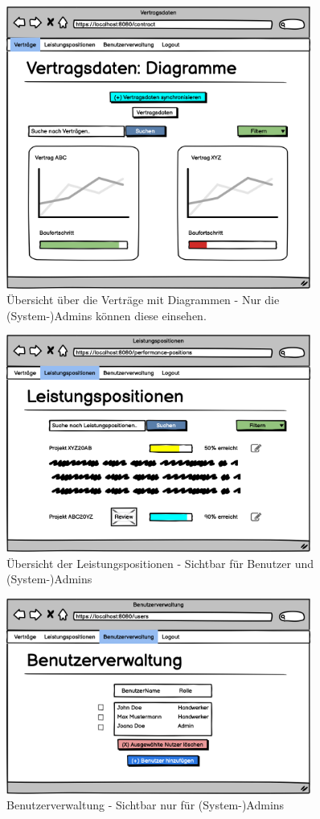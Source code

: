 \begin{figure}[h]
\centering
\includegraphics[width=10cm]{img/mockup_web/admin-vertraege-diagramme.png}
\caption{Übersicht über die Verträge mit Diagrammen - Nur die (System-)Admins können diese einsehen.}
\end{figure}

\begin{figure}[h]
\centering
\includegraphics[width=10cm]{img/mockup_web/admin-und-benutzer-leistungspositionen.png}
\caption{Übersicht der Leistungspositionen - Sichtbar für Benutzer und (System-)Admins}
\end{figure}

\begin{figure}[h]
\centering
\includegraphics[width=10cm]{img/mockup_web/admin-benutzerverwaltung.png}
\caption{Benutzerverwaltung - Sichtbar nur für (System-)Admins}
\end{figure}

